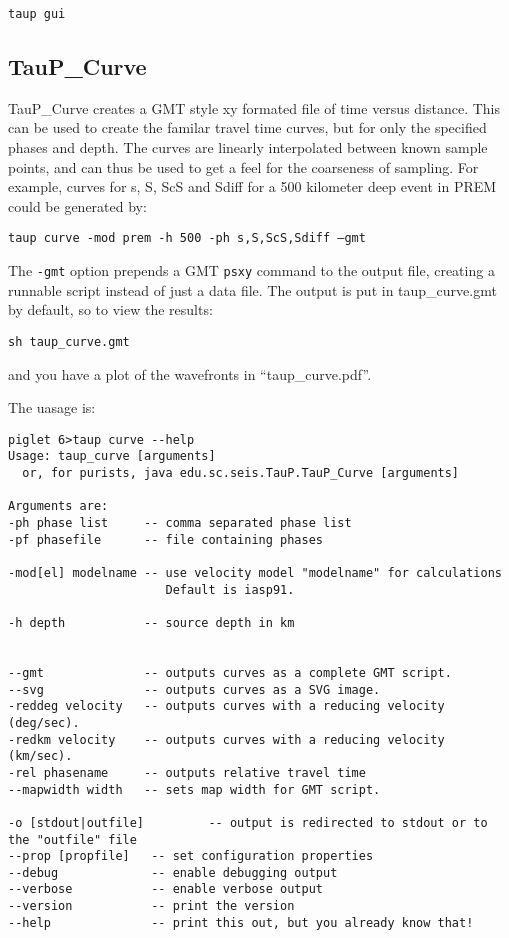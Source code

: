 \texttt{taup gui}

\subsection{TauP\_Curve}
TauP\_Curve creates a GMT style xy formated file of time versus distance.
This can be used to create the familar travel time curves, but for
only the specified phases and depth. The curves are linearly interpolated
between known sample points, and can thus be used to get a feel for the
coarseness of sampling. For example, curves for s, S, ScS and Sdiff
for a 500 kilometer deep event in PREM could be generated by:

\texttt{taup curve -mod prem -h 500 -ph s,S,ScS,Sdiff --gmt}

The \texttt{-gmt} option prepends a GMT \texttt{psxy} command to the output
file, creating a runnable script instead of just a data file.
The output is put in taup\_curve.gmt by default, so to view the results:

\begin{verbatim}
sh taup_curve.gmt
\end{verbatim}

and you have a plot of the wavefronts in ``taup\_curve.pdf''.

The uasage is:
\begin{verbatim}
piglet 6>taup curve --help
Usage: taup_curve [arguments]
  or, for purists, java edu.sc.seis.TauP.TauP_Curve [arguments]

Arguments are:
-ph phase list     -- comma separated phase list
-pf phasefile      -- file containing phases

-mod[el] modelname -- use velocity model "modelname" for calculations
                      Default is iasp91.

-h depth           -- source depth in km


--gmt              -- outputs curves as a complete GMT script.
--svg              -- outputs curves as a SVG image.
-reddeg velocity   -- outputs curves with a reducing velocity (deg/sec).
-redkm velocity    -- outputs curves with a reducing velocity (km/sec).
-rel phasename     -- outputs relative travel time
--mapwidth width   -- sets map width for GMT script.

-o [stdout|outfile]         -- output is redirected to stdout or to the "outfile" file
--prop [propfile]   -- set configuration properties
--debug             -- enable debugging output
--verbose           -- enable verbose output
--version           -- print the version
--help              -- print this out, but you already know that!
\end{verbatim}

